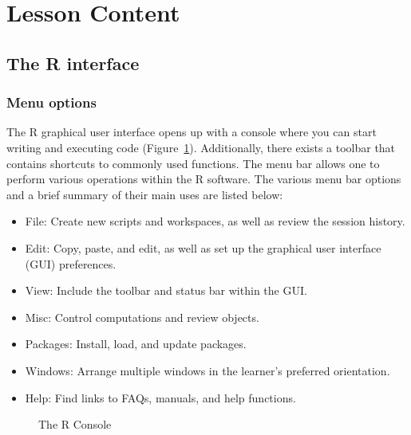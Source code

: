 \documentclass[
  letterpaper,
  DIV=11,
  numbers=noendperiod]{scrreprt}
\providecommand{\tightlist}{%
  \setlength{\itemsep}{0pt}\setlength{\parskip}{0pt}}\usepackage{longtable,booktabs,array}
\begin{document}
\section{Lesson Content}\label{lesson-content-2}

\subsection{The R interface}\label{the-r-interface}

\subsubsection{Menu options}\label{menu-options}

The R graphical user interface opens up with a console where you can
start writing and executing code (Figure~\ref{fig-r-console-1}).
Additionally, there exists a toolbar that contains shortcuts to commonly
used functions. The menu bar allows one to perform various operations
within the R software. The various menu bar options and a brief summary
of their main uses are listed below:

\begin{itemize}
\tightlist
\item
  File: Create new scripts and workspaces, as well as review the session
  history.
\item
  Edit: Copy, paste, and edit, as well as set up the graphical user
  interface (GUI) preferences.
\item
  View: Include the toolbar and status bar within the GUI.
\item
  Misc: Control computations and review objects.
\item
  Packages: Install, load, and update packages.
\item
  Windows: Arrange multiple windows in the learner's preferred
  orientation.
\item
  Help: Find links to FAQs, manuals, and help functions.
\end{itemize}

\begin{figure}


\caption{\label{fig-r-console-1}The R Console}

\end{figure}%
\end{document}
